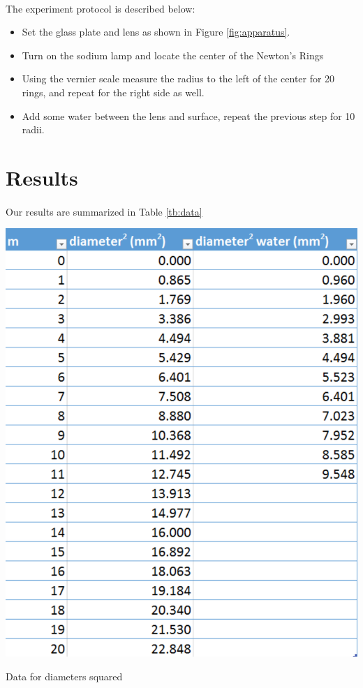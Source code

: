 \documentclass{article}
\begin{document}
\paragraph{}

The experiment protocol is described below:
\begin{itemize}
  \item Set the glass plate and lens as shown in Figure \ref{fig:apparatus}.
  \item Turn on the sodium lamp and locate the center of the Newton's Rings
  \item Using the vernier scale measure the radius to the left of the center for 20 rings, and repeat for the right side as well.
  \item Add some water between the lens and surface, repeat the previous step for 10 radii.
\end{itemize}

\section{Results}
\paragraph{}
Our results are summarized in Table \ref{tb:data}

\begin{table}
    \includegraphics{./img/TABLE.pdf}
  \caption{Data for diameters squared}
  \label{}
\end{table}
\end{document}
